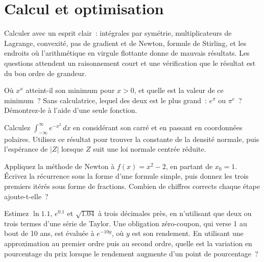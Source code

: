\chapter{Calcul et optimisation}\label{ch:iv1:calculus-and-optimisation}

\begin{ivtrains}
Calculer avec un esprit clair~: intégrales par symétrie, multiplicateurs de Lagrange, convexité, pas de gradient et de Newton, formule de Stirling, et les endroits où l'arithmétique en virgule flottante donne de mauvais résultats. Les questions attendent un raisonnement court et une vérification que le résultat est du bon ordre de grandeur.
\end{ivtrains}

\begin{question}\label{iq:iv1:calculus-and-optimisation:1}
Où $x^x$ atteint-il son minimum pour $x > 0$, et quelle est la valeur de ce minimum~? Sans calculatrice, lequel des deux est le plus grand~: $e^\pi$ ou $\pi^e$~? Démontrez-le à l'aide d'une seule fonction.
\end{question}

\begin{question}\label{iq:iv1:calculus-and-optimisation:2}
Calculez $\int_{-\infty}^{\infty} e^{-x^2}\,dx$ en considérant son carré et en passant en coordonnées polaires. Utilisez ce résultat pour trouver la constante de la densité normale, puis l'espérance de $|Z|$ lorsque $Z$ suit une loi normale centrée réduite.
\end{question}

\begin{question}\label{iq:iv1:calculus-and-optimisation:3}
Appliquez la méthode de Newton à $f(x) = x^2 - 2$, en partant de $x_0 = 1$. Écrivez la récurrence sous la forme d'une formule simple, puis donnez les trois premiers itérés sous forme de fractions. Combien de chiffres corrects chaque étape ajoute-t-elle~?
\end{question}

\begin{question}\label{iq:iv1:calculus-and-optimisation:4}
Estimez $\ln 1.1$, $e^{0.1}$ et $\sqrt{1.04}$ à trois décimales près, en n'utilisant que deux ou trois termes d'une série de Taylor. Une obligation zéro-coupon, qui verse 1 au bout de 10 ans, est évaluée à $e^{-10y}$, où $y$ est son rendement. En utilisant une approximation au premier ordre puis au second ordre, quelle est la variation en pourcentage du prix lorsque le rendement augmente d'un point de pourcentage~?
\end{question}

